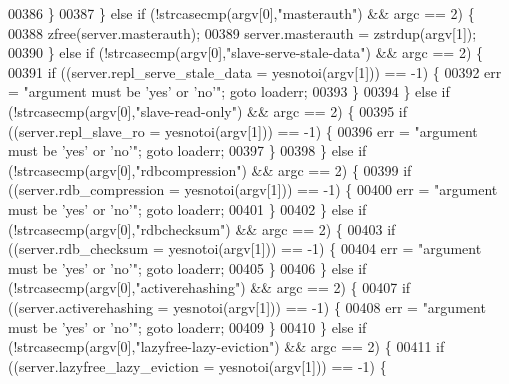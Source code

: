 \begin{DoxyCode}
{{00386             \}
00387         \} \textcolor{keywordflow}{else} \textcolor{keywordflow}{if} (!strcasecmp(argv[0],\textcolor{stringliteral}{"masterauth"}) && argc == 2) \{
00388             zfree(server.masterauth);
00389             server.masterauth = zstrdup(argv[1]);
00390         \} \textcolor{keywordflow}{else} \textcolor{keywordflow}{if} (!strcasecmp(argv[0],\textcolor{stringliteral}{"slave-serve-stale-data"}) && argc == 2) \{
00391             \textcolor{keywordflow}{if} ((server.repl\_serve\_stale\_data = yesnotoi(argv[1])) == -1) \{
00392                 err = \textcolor{stringliteral}{"argument must be 'yes' or 'no'"}; \textcolor{keywordflow}{goto} loaderr;
00393             \}
00394         \} \textcolor{keywordflow}{else} \textcolor{keywordflow}{if} (!strcasecmp(argv[0],\textcolor{stringliteral}{"slave-read-only"}) && argc == 2) \{
00395             \textcolor{keywordflow}{if} ((server.repl\_slave\_ro = yesnotoi(argv[1])) == -1) \{
00396                 err = \textcolor{stringliteral}{"argument must be 'yes' or 'no'"}; \textcolor{keywordflow}{goto} loaderr;
00397             \}
00398         \} \textcolor{keywordflow}{else} \textcolor{keywordflow}{if} (!strcasecmp(argv[0],\textcolor{stringliteral}{"rdbcompression"}) && argc == 2) \{
00399             \textcolor{keywordflow}{if} ((server.rdb\_compression = yesnotoi(argv[1])) == -1) \{
00400                 err = \textcolor{stringliteral}{"argument must be 'yes' or 'no'"}; \textcolor{keywordflow}{goto} loaderr;
00401             \}
00402         \} \textcolor{keywordflow}{else} \textcolor{keywordflow}{if} (!strcasecmp(argv[0],\textcolor{stringliteral}{"rdbchecksum"}) && argc == 2) \{
00403             \textcolor{keywordflow}{if} ((server.rdb\_checksum = yesnotoi(argv[1])) == -1) \{
00404                 err = \textcolor{stringliteral}{"argument must be 'yes' or 'no'"}; \textcolor{keywordflow}{goto} loaderr;
00405             \}
00406         \} \textcolor{keywordflow}{else} \textcolor{keywordflow}{if} (!strcasecmp(argv[0],\textcolor{stringliteral}{"activerehashing"}) && argc == 2) \{
00407             \textcolor{keywordflow}{if} ((server.activerehashing = yesnotoi(argv[1])) == -1) \{
00408                 err = \textcolor{stringliteral}{"argument must be 'yes' or 'no'"}; \textcolor{keywordflow}{goto} loaderr;
00409             \}
00410         \} \textcolor{keywordflow}{else} \textcolor{keywordflow}{if} (!strcasecmp(argv[0],\textcolor{stringliteral}{"lazyfree-lazy-eviction"}) && argc == 2) \{
00411             \textcolor{keywordflow}{if} ((server.lazyfree\_lazy\_eviction = yesnotoi(argv[1])) == -1) \{
}}
\end{DoxyCode}
